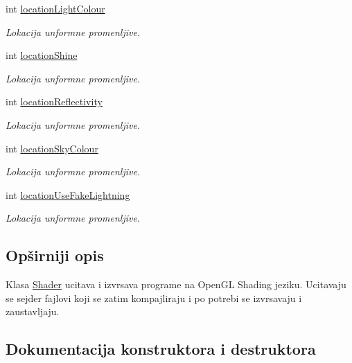 \begin{DoxyCompactItemize}
int \hyperlink{classshader_1_1Shader_a3aa71dac965d453a149b74e8282e6863}{location\+Light\+Colour}
\begin{DoxyCompactList}\small\item\em Lokacija unformne promenljive. \end{DoxyCompactList}\item 
int \hyperlink{classshader_1_1Shader_a7b1653ae0ccaa625e728ba76940d82f4}{location\+Shine}
\begin{DoxyCompactList}\small\item\em Lokacija unformne promenljive. \end{DoxyCompactList}\item 
int \hyperlink{classshader_1_1Shader_ad31f87938d470ce130a7053da45af551}{location\+Reflectivity}
\begin{DoxyCompactList}\small\item\em Lokacija unformne promenljive. \end{DoxyCompactList}\item 
int \hyperlink{classshader_1_1Shader_af74548a61cd3a07047dcf2d9adb5a9a9}{location\+Sky\+Colour}
\begin{DoxyCompactList}\small\item\em Lokacija unformne promenljive. \end{DoxyCompactList}\item 
int \hyperlink{classshader_1_1Shader_a07f4f399ad468c2c3af89e185d157813}{location\+Use\+Fake\+Lightning}
\begin{DoxyCompactList}\small\item\em Lokacija unformne promenljive. \end{DoxyCompactList}\end{DoxyCompactItemize}


\subsection{Opširniji opis}
Klasa \hyperlink{classshader_1_1Shader}{Shader} ucitava i izvrsava programe na Open\+GL Shading jeziku. Ucitavaju se sejder fajlovi koji se zatim kompajliraju i po potrebi se izvrsavaju i zaustavljaju. 

\subsection{Dokumentacija konstruktora i destruktora}
\mbox{\label{classshader_1_1Shader_a8346a24ed22edf1b1736cbe02dd27758}} 
